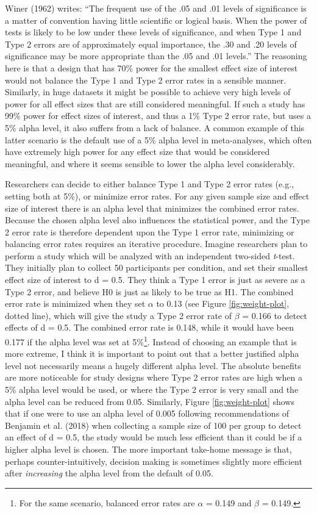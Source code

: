 \documentclass[
  english,
  ,jou,floatsintext]{apa6}
\begin{document}
Winer (1962) writes: ``The frequent use of the .05 and .01 levels of significance is a matter of convention having little scientific or logical basis. When the power of tests is likely to be low under these levels of significance, and when Type 1 and Type 2 errors are of approximately equal importance, the .30 and .20 levels of significance may be more appropriate than the .05 and .01 levels.'' The reasoning here is that a design that has 70\% power for the smallest effect size of interest would not balance the Type 1 and Type 2 error rates in a sensible manner. Similarly, in huge datasets it might be possible to achieve very high levels of power for all effect sizes that are still considered meaningful. If such a study has 99\% power for effect sizes of interest, and thus a 1\% Type 2 error rate, but uses a 5\% alpha level, it also suffers from a lack of balance. A common example of this latter scenario is the default use of a 5\% alpha level in meta-analyses, which often have extremely high power for any effect size that would be considered meaningful, and where it seems sensible to lower the alpha level considerably.

Researchers can decide to either balance Type 1 and Type 2 error rates (e.g., setting both at 5\%), or minimize error rates. For any given sample size and effect size of interest there is an alpha level that minimizes the combined error rates. Because the chosen alpha level also influences the statistical power, and the Type 2 error rate is therefore dependent upon the Type 1 error rate, minimizing or balancing error rates requires an iterative procedure. Imagine researchers plan to perform a study which will be analyzed with an independent two-sided \emph{t}-test. They initially plan to collect 50 participants per condition, and set their smallest effect size of interest to d = 0.5. They think a Type 1 error is just as severe as a Type 2 error, and believe H0 is just as likely to be true as H1. The combined error rate is minimized when they set \(\alpha\) to 0.13 (see Figure \ref{fig:weight-plot}, dotted line), which will give the study a Type 2 error rate of \(\beta\) = 0.166 to detect effects of d = 0.5. The combined error rate is 0.148, while it would have been 0.177 if the alpha level was set at 5\%\footnote{For the same scenario, balanced error rates are \(\alpha\) = 0.149 and \(\beta\) = 0.149.}. Instead of choosing an example that is more extreme, I think it is important to point out that a better justified alpha level not necessarily means a hugely different alpha level. The absolute benefits are more noticeable for study designs where Type 2 error rates are high when a 5\% alpha level would be used, or where the Type 2 error is very small and the alpha level can be reduced from 0.05. Similarly, Figure \ref{fig:weight-plot} shows that if one were to use an alpha level of 0.005 following recommendations of Benjamin et al. (2018) when collecting a sample size of 100 per group to detect an effect of d = 0.5, the study would be much less efficient than it could be if a higher alpha level is chosen. The more important take-home message is that, perhaps counter-intuitively, decision making is sometimes slightly more efficient after \emph{increasing} the alpha level from the default of 0.05.
\end{document}
